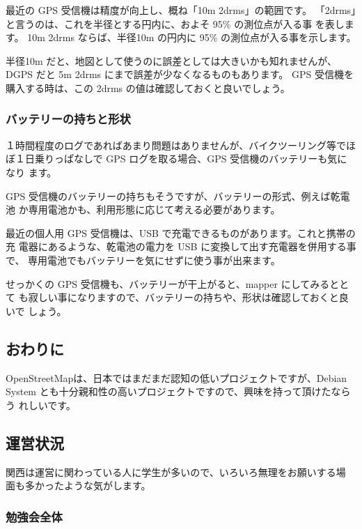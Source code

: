 \documentclass[mingoth,a4paper]{jsarticle}
\begin{document}
最近の GPS 受信機は精度が向上し、概ね「10m 2drms」の範囲です。
「2drms」と言うのは、これを半径とする円内に、およそ 95\% の測位点が入る事
を表します。
10m 2drms ならば、半径10m の円内に 95\% の測位点が入る事を示します。

半径10m だと、地図として使うのに誤差としては大きいかも知れませんが、DGPS
だと 5m 2drms にまで誤差が少なくなるものもあります。
GPS 受信機を購入する時は、この 2drms の値は確認しておくと良いでしょう。

\subsubsection{バッテリーの持ちと形状}

１時間程度のログであればあまり問題はありませんが、バイクツーリング等でほ
ぼ１日乗りっぱなしで GPS ログを取る場合、GPS 受信機のバッテリーも気になり
ます。

GPS 受信機のバッテリーの持ちもそうですが、バッテリーの形式、例えば乾電池
か専用電池かも、利用形態に応じて考える必要があります。

最近の個人用 GPS 受信機は、USB で充電できるものがあります。これと携帯の充
電器にあるような、乾電池の電力を USB に変換して出す充電器を併用する事で、
専用電池でもバッテリーを気にせずに使う事が出来ます。

せっかくの GPS 受信機も、バッテリーが干上がると、mapper にしてみるととて
も寂しい事になりますので、バッテリーの持ちや、形状は確認しておくと良いで
しょう。

\subsection{おわりに}
OpenStreetMapは、日本ではまだまだ認知の低いプロジェクトですが、Debian
System とも十分親和性の高いプロジェクトですので、興味を持って頂けたならう
れしいです。




\subsection{運営状況}

関西は運営に関わっている人に学生が多いので、いろいろ無理をお願いする場
面も多かったような気がします。

\subsubsection{勉強会全体}
\end{document}
